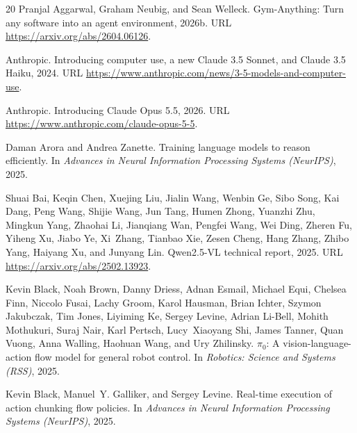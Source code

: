 \documentclass{article}
\begin{document}
\begin{thebibliography}{20}
Pranjal Aggarwal, Graham Neubig, and Sean Welleck.
\newblock Gym-Anything: Turn any software into an agent environment, 2026b.
\newblock URL \url{https://arxiv.org/abs/2604.06126}.

Anthropic.
\newblock Introducing computer use, a new Claude 3.5 Sonnet, and Claude 3.5 Haiku, 2024.
\newblock URL \url{https://www.anthropic.com/news/3-5-models-and-computer-use}.

Anthropic.
\newblock Introducing Claude Opus 5.5, 2026.
\newblock URL \url{https://www.anthropic.com/claude-opus-5-5}.

Daman Arora and Andrea Zanette.
\newblock Training language models to reason efficiently.
\newblock In \emph{Advances in Neural Information Processing Systems (NeurIPS)}, 2025.

Shuai Bai, Keqin Chen, Xuejing Liu, Jialin Wang, Wenbin Ge, Sibo Song, Kai Dang, Peng Wang, Shijie Wang, Jun Tang, Humen Zhong, Yuanzhi Zhu, Mingkun Yang, Zhaohai Li, Jianqiang Wan, Pengfei Wang, Wei Ding, Zheren Fu, Yiheng Xu, Jiabo Ye, Xi~Zhang, Tianbao Xie, Zesen Cheng, Hang Zhang, Zhibo Yang, Haiyang Xu, and Junyang Lin.
\newblock Qwen2.5-VL technical report, 2025.
\newblock URL \url{https://arxiv.org/abs/2502.13923}.

Kevin Black, Noah Brown, Danny Driess, Adnan Esmail, Michael Equi, Chelsea Finn, Niccolo Fusai, Lachy Groom, Karol Hausman, Brian Ichter, Szymon Jakubczak, Tim Jones, Liyiming Ke, Sergey Levine, Adrian Li-Bell, Mohith Mothukuri, Suraj Nair, Karl Pertsch, Lucy~Xiaoyang Shi, James Tanner, Quan Vuong, Anna Walling, Haohuan Wang, and Ury Zhilinsky.
\newblock $\pi_0$: A vision-language-action flow model for general robot control.
\newblock In \emph{Robotics: Science and Systems (RSS)}, 2025.

Kevin Black, Manuel~Y. Galliker, and Sergey Levine.
\newblock Real-time execution of action chunking flow policies.
\newblock In \emph{Advances in Neural Information Processing Systems (NeurIPS)}, 2025.


\end{thebibliography}
\end{document}
